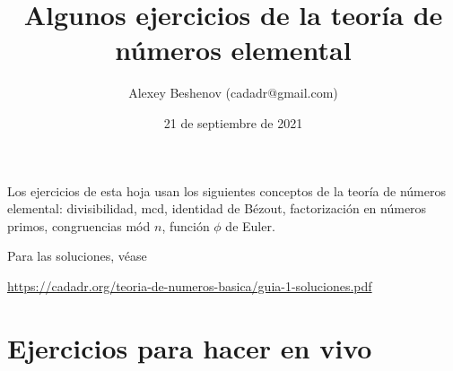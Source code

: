 \documentclass{article}
\title{Algunos ejercicios de la teoría de números elemental}
\author{Alexey Beshenov (cadadr@gmail.com)}
\date{21 de septiembre de 2021}
\theoremstyle{definition}
\begin{document}
\maketitle

Los ejercicios de esta hoja usan los siguientes conceptos de la teoría de
números elemental: divisibilidad, mcd, identidad de Bézout, factorización en
números primos, congruencias mód $n$, función $\phi$ de Euler.

\ifdefined\solutions
\else
\vspace{1em}

Para las soluciones, véase

\url{https://cadadr.org/teoria-de-numeros-basica/guia-1-soluciones.pdf}
\fi

\section*{Ejercicios para hacer en vivo}
\end{document}
